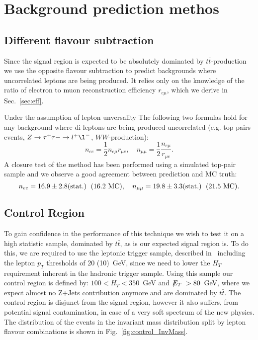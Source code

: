 \section{Background prediction methos}

\subsection{Different flavour subtraction} \label{sec:ofossubtraction}
Since the signal region is expected to be absolutely 
dominated by $t\bar{t}$-production we use
the opposite flavour subtraction to predict
backgrounds where uncorrelated leptons are being produced.
It relies only on the knowledge of the ratio
of electron to muon reconstruction efficiency $r_{e\mu}$,
which we derive in Sec.~\ref{sec:eff}.

Under the assumption of lepton unversality
The following two formulas hold for any background
where di-leptons are being produced uncorrelated 
(e.g. top-pairs events, $Z \rightarrow \tau^{+} \tau{-} \rightarrow 
l^{+} \l^-$, $WW$-production):
$$
n_{ee} = \frac12n_{e\mu}r_{\mu{}e}, \quad n_{\mu\mu} = \frac12\frac{n_{e\mu}}{r_{\mu{}e}}.
$$
A closure test of the method has been performed
using a simulated top-pair sample and
we observe a good agreement between prediction and MC truth:
$$
n_{ee} = 16.9 \pm 2.8 (\textnormal{stat.}) \; \textnormal{ (16.2 MC)}, \quad n_{\mu\mu} = 19.8 \pm 3.3 (\textnormal{stat.}) \; \textnormal{ (21.5 MC)}.
$$


\subsection{Control Region}

To gain confidence in the performance of this technique we wish to test it on a high statistic sample, dominated by 
$t\bar{t}$, as is our expected signal region is. To do this, we are required to use the leptonic trigger sample, 
described in~\cite{avi} including the lepton $p_T$ thresholds of 20 (10)~GeV, 
since we need to lower the $H_T$ requirement inherent in the hadronic trigger sample. Using 
this sample our control region is defined by:  $100 < H_T < 350$~GeV and $\displaystyle{\not} E_T~>80$~GeV,
where we expect almost no Z+Jets contribution anymore and are dominated by $t\bar{t}$.
The control region is disjunct from the signal region, however it also suffers,
from potential signal contamination, in case of a very soft \MET spectrum of the new physics.
The distribution of the events in the invariant mass distribution split by lepton flavour combinations
is shown in Fig.~\ref{fig:control_InvMass}.

